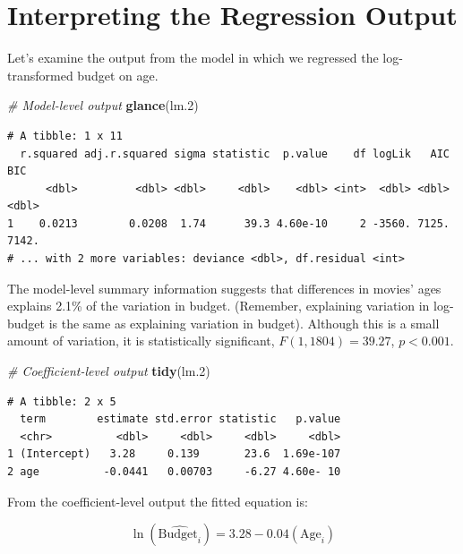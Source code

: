 \documentclass[]{book}
\newenvironment{Shaded}{\begin{snugshade}}{\end{snugshade}}
\newcommand{\CommentTok}[1]{\textcolor[rgb]{0.56,0.35,0.01}{\textit{#1}}}
\newcommand{\FloatTok}[1]{\textcolor[rgb]{0.00,0.00,0.81}{#1}}
\newcommand{\KeywordTok}[1]{\textcolor[rgb]{0.13,0.29,0.53}{\textbf{#1}}}
\newcommand{\NormalTok}[1]{#1}
\begin{document}
\hypertarget{interpreting-the-regression-output}{%
\section{Interpreting the Regression Output}\label{interpreting-the-regression-output}}

Let's examine the output from the model in which we regressed the log-transformed budget on age.

\begin{Shaded}
\begin{Highlighting}[]
\CommentTok{# Model-level output}
\KeywordTok{glance}\NormalTok{(lm}\FloatTok{.2}\NormalTok{)}
\end{Highlighting}
\end{Shaded}

\begin{verbatim}
# A tibble: 1 x 11
  r.squared adj.r.squared sigma statistic  p.value    df logLik   AIC   BIC
      <dbl>         <dbl> <dbl>     <dbl>    <dbl> <int>  <dbl> <dbl> <dbl>
1    0.0213        0.0208  1.74      39.3 4.60e-10     2 -3560. 7125. 7142.
# ... with 2 more variables: deviance <dbl>, df.residual <int>
\end{verbatim}

The model-level summary information suggests that differences in movies' ages explains 2.1\% of the variation in budget. (Remember, explaining variation in log-budget is the same as explaining variation in budget). Although this is a small amount of variation, it is statistically significant, \(F(1,1804)=39.27\), \(p<0.001\).

\begin{Shaded}
\begin{Highlighting}[]
\CommentTok{# Coefficient-level output}
\KeywordTok{tidy}\NormalTok{(lm}\FloatTok{.2}\NormalTok{)}
\end{Highlighting}
\end{Shaded}

\begin{verbatim}
# A tibble: 2 x 5
  term        estimate std.error statistic   p.value
  <chr>          <dbl>     <dbl>     <dbl>     <dbl>
1 (Intercept)   3.28     0.139       23.6  1.69e-107
2 age          -0.0441   0.00703     -6.27 4.60e- 10
\end{verbatim}

From the coefficient-level output the fitted equation is:

\[
\ln\left(\hat{\mathrm{Budget}_i}\right) = 3.28 - 0.04(\mathrm{Age}_i)
\]
\end{document}
